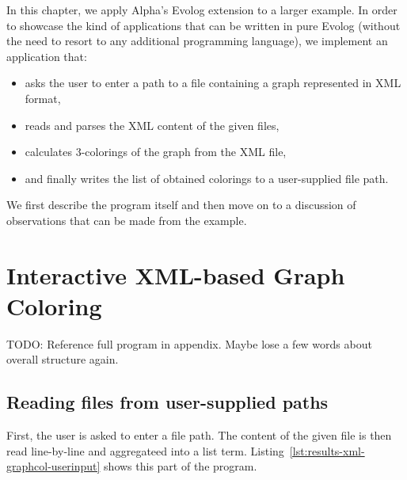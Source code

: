 In this chapter, we apply Alpha's Evolog extension to a larger example. In order to showcase the kind of applications that can be written in pure Evolog (without the need to resort to any additional programming language), we implement an application that:
\begin{itemize}
    \item asks the user to enter a path to a file containing a graph represented in XML format,
    \item reads and parses the XML content of the given files,
    \item calculates 3-colorings of the graph from the XML file,
    \item and finally writes the list of obtained colorings to a user-supplied file path.
\end{itemize}    

We first describe the program itself and then move on to a discussion of observations that can be made from the example.

\section{Interactive XML-based Graph Coloring}
\label{sec:results-xml-graphcol}

TODO: Reference full program in appendix. Maybe lose a few words about overall structure again.

\subsection{Reading files from user-supplied paths}

First, the user is asked to enter a file path. The content of the given file is then read line-by-line and aggregateed into a list term. Listing~\ref{lst:results-xml-graphcol-userinput} shows this part of the program.

